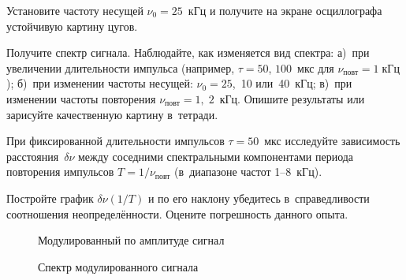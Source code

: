 \begin{lab:task}
\item Установите частоту несущей $\nu_0=25$~кГц и получите на экране осциллографа
устойчивую картину цугов.

\item Получите спектр сигнала. Наблюдайте, как изменяется вид спектра:
а)~при увеличении длительности импульса (например, $\tau=50$, $100$~мкс
для $\nu_\text{повт}=1\;кГц$); б)~при изменении частоты несущей:
$\nu_0=25$,~10 или~40~кГц; в)~при изменении частоты повторения
$\nu_{повт}=1,\;2$~кГц. Опишите результаты или зарисуйте качественную
картину в~тетради.

\item При фиксированной длительности импульсов $\tau=50$~мкс исследуйте
зависимость расстояния~$\delta \nu$ между соседними спектральными компонентами
периода повторения импульсов $T=1/\nu_\text{повт}$
(в~диапазоне частот 1--8~кГц).

\item Постройте график $\delta \nu(1/T)$ и по его наклону
убедитесь в~справедливости соотношения неопределённости.
Оцените погрешность данного опыта.




\begin{figure}[h!]
\hfil\hfil
\begin{minipage}{0.4\textwidth}
    \missingfigure{}
    \caption{Модулированный по амплитуде сигнал}
\end{minipage}
\hfil
\begin{minipage}{0.4\textwidth}
    \missingfigure{}
    \caption{Спектр модулированного сигнала}
\end{minipage}
\end{figure}


\end{lab:task}
